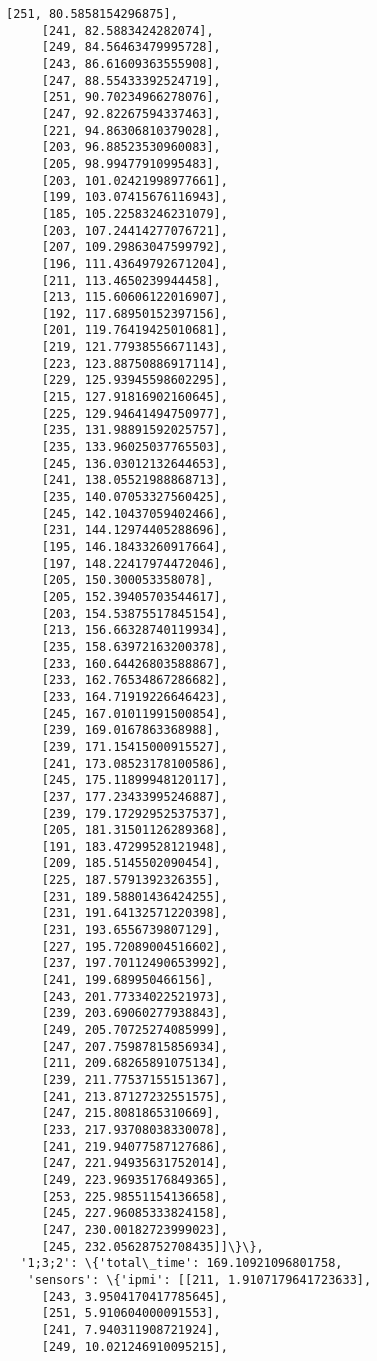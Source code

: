 \documentclass[11pt]{article}
\begin{document}
\begin{tcolorbox}[breakable, size=fbox, boxrule=.5pt, pad at break*=1mm, opacityfill=0]
\begin{Verbatim}[commandchars=\\\{\}]
     [251, 80.5858154296875],
     [241, 82.5883424282074],
     [249, 84.56463479995728],
     [243, 86.61609363555908],
     [247, 88.55433392524719],
     [251, 90.70234966278076],
     [247, 92.82267594337463],
     [221, 94.86306810379028],
     [203, 96.88523530960083],
     [205, 98.99477910995483],
     [203, 101.02421998977661],
     [199, 103.07415676116943],
     [185, 105.22583246231079],
     [203, 107.24414277076721],
     [207, 109.29863047599792],
     [196, 111.43649792671204],
     [211, 113.4650239944458],
     [213, 115.60606122016907],
     [192, 117.68950152397156],
     [201, 119.76419425010681],
     [219, 121.77938556671143],
     [223, 123.88750886917114],
     [229, 125.93945598602295],
     [215, 127.91816902160645],
     [225, 129.94641494750977],
     [235, 131.98891592025757],
     [235, 133.96025037765503],
     [245, 136.03012132644653],
     [241, 138.05521988868713],
     [235, 140.07053327560425],
     [245, 142.10437059402466],
     [231, 144.12974405288696],
     [195, 146.18433260917664],
     [197, 148.22417974472046],
     [205, 150.300053358078],
     [205, 152.39405703544617],
     [203, 154.53875517845154],
     [213, 156.66328740119934],
     [235, 158.63972163200378],
     [233, 160.64426803588867],
     [233, 162.76534867286682],
     [233, 164.71919226646423],
     [245, 167.01011991500854],
     [239, 169.0167863368988],
     [239, 171.15415000915527],
     [241, 173.08523178100586],
     [245, 175.11899948120117],
     [237, 177.23433995246887],
     [239, 179.17292952537537],
     [205, 181.31501126289368],
     [191, 183.47299528121948],
     [209, 185.5145502090454],
     [225, 187.5791392326355],
     [231, 189.58801436424255],
     [231, 191.64132571220398],
     [231, 193.6556739807129],
     [227, 195.72089004516602],
     [237, 197.70112490653992],
     [241, 199.689950466156],
     [243, 201.77334022521973],
     [239, 203.69060277938843],
     [249, 205.70725274085999],
     [247, 207.75987815856934],
     [211, 209.68265891075134],
     [239, 211.77537155151367],
     [241, 213.87127232551575],
     [247, 215.8081865310669],
     [233, 217.93708038330078],
     [241, 219.94077587127686],
     [247, 221.94935631752014],
     [249, 223.96935176849365],
     [253, 225.98551154136658],
     [245, 227.96085333824158],
     [247, 230.00182723999023],
     [245, 232.05628752708435]]\}\},
  '1;3;2': \{'total\_time': 169.10921096801758,
   'sensors': \{'ipmi': [[211, 1.9107179641723633],
     [243, 3.9504170417785645],
     [251, 5.910604000091553],
     [241, 7.940311908721924],
     [249, 10.021246910095215],

\end{Verbatim}
\end{tcolorbox}
\end{document}
